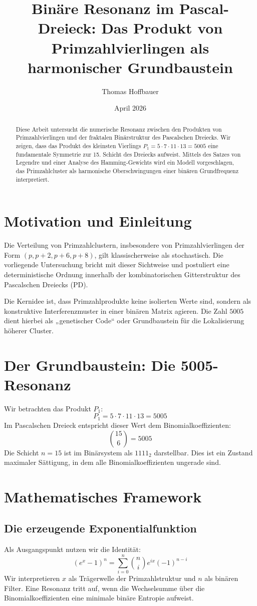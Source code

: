 \documentclass[11pt,a4paper]{article}
\title{\textbf{Binäre Resonanz im Pascal-Dreieck: Das Produkt von Primzahlvierlingen als harmonischer Grundbaustein}}
\author{Thomas Hoffbauer}
\date{April 2026}
\begin{document}
	
	\maketitle
	
	\begin{abstract}
		Diese Arbeit untersucht die numerische Resonanz zwischen den Produkten von Primzahlvierlingen und der fraktalen Binärstruktur des Pascalschen Dreiecks. Wir zeigen, dass das Produkt des kleinsten Vierlings $P_1 = 5 \cdot 7 \cdot 11 \cdot 13 = 5005$ eine fundamentale Symmetrie zur 15. Schicht des Dreiecks aufweist. Mittels des Satzes von Legendre und einer Analyse des Hamming-Gewichts wird ein Modell vorgeschlagen, das Primzahlcluster als harmonische Oberschwingungen einer binären Grundfrequenz interpretiert.
	\end{abstract}
	
	\section{Motivation und Einleitung}
	Die Verteilung von Primzahlclustern, insbesondere von Primzahlvierlingen der Form $(p, p+2, p+6, p+8)$, gilt klassischerweise als stochastisch. Die vorliegende Untersuchung bricht mit dieser Sichtweise und postuliert eine deterministische Ordnung innerhalb der kombinatorischen Gitterstruktur des Pascalschen Dreiecks (PD). 
	
	Die Kernidee ist, dass Primzahlprodukte keine isolierten Werte sind, sondern als konstruktive Interferenzmuster in einer binären Matrix agieren. Die Zahl $5005$ dient hierbei als „genetischer Code“ oder Grundbaustein für die Lokalisierung höherer Cluster.
	
	\section{Der Grundbaustein: Die 5005-Resonanz}
	Wir betrachten das Produkt $P_1$:
	$$P_1 = 5 \cdot 7 \cdot 11 \cdot 13 = 5005$$
	Im Pascalschen Dreieck entspricht dieser Wert dem Binomialkoeffizienten:
	$$\binom{15}{6} = 5005$$
	Die Schicht $n=15$ ist im Binärsystem als $1111_2$ darstellbar. Dies ist ein Zustand maximaler Sättigung, in dem alle Binomialkoeffizienten ungerade sind. 
	
	\section{Mathematisches Framework}
	
	\subsection{Die erzeugende Exponentialfunktion}
	Als Ausgangspunkt nutzen wir die Identität:
	$$(e^x - 1)^n = \sum_{i=0}^{n} \binom{n}{i} e^{ix} (-1)^{n-i}$$
	Wir interpretieren $x$ als Trägerwelle der Primzahlstruktur und $n$ als binären Filter. Eine Resonanz tritt auf, wenn die Wechselsumme über die Binomialkoeffizienten eine minimale binäre Entropie aufweist.
	
\end{document}

